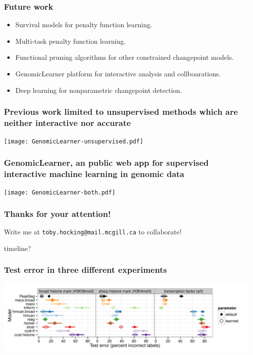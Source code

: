 \documentclass{beamer}
\begin{document}
\begin{frame}
  \frametitle{Future work}
  \begin{itemize}
  \item Survival models for penalty function learning.
  \item Multi-task penalty function learning.
  \item Functional pruning algorithms for other constrained
    changepoint models.
  \item GenomicLearner platform for interactive analysis and
    collboarations.
  \item Deep learning for nonparametric changepoint detection.
  \end{itemize}
\end{frame}

\begin{frame}
  \frametitle{Previous work limited to 
    unsupervised methods
which are neither interactive nor accurate
}
  \texttt{[image: GenomicLearner-unsupervised.pdf]}
\end{frame}

\begin{frame}
  \frametitle{GenomicLearner, an public web app for supervised interactive machine learning in genomic data}
  \texttt{[image: GenomicLearner-both.pdf]}
\end{frame}


\begin{frame}
  \frametitle{Thanks for your attention!}
  Write me at \alert{\texttt{toby.hocking@mail.mcgill.ca}} to collaborate!

  \vskip 1cm

  timeline?

\end{frame}

\begin{frame}
  \frametitle{Test error in three different experiments}
  \includegraphics[width=1.1\textwidth]{figure-test-error-dots-mean.pdf}
\end{frame}
\end{document}
